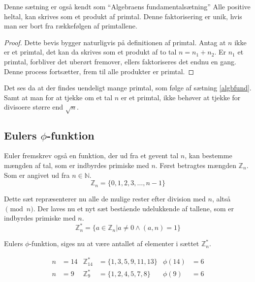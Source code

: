 %



\begin{sent}%
    Denne sætning er også kendt som ``Algebraens fundamentalsætning''
    Alle positive heltal, kan skrives som et produkt af primtal.
    Denne faktorisering er unik, hvis man ser bort fra rækkefølgen af primtallene.
    \label{algbfund}
\end{sent}

\begin{proof}
    Dette bevis bygger naturligvis på definitionen af primtal.
    Antag at \(n\) ikke er et primtal, det kan da skrives som et produkt af to tal \(n = n_1 + n_2\).
    Er \(n_1\) et primtal, forbliver det uberørt fremover, ellers faktoriseres det endnu en gang.
    Denne process fortsætter, frem til alle produkter er primtal.
\end{proof}

Det ses da at der findes uendeligt mange primtal, som følge af sætning \ref{algbfund}.
Samt at man for at tjekke om et tal \(n\) er et primtal, ikke behøver at tjekke for divisoere større end \(\sqrt{n}\).



\subsection{Eulers \texorpdfstring{\(\phi\)}{Lg}-funktion}
Euler fremskrev også en funktion, der ud fra et gevent tal \(n\), kan bestemme mængden af tal, som er indbyrdes primiske med \(n\).
Først betragtes mængden \(\mathbb{Z}_n\). Som er angivet ud fra \(n \in \mathbb{N}\).
\[\mathbb{Z}_n = \{0, 1, 2, 3, \hdots, n-1 \}\]

Dette sæt repræsenterer nu alle de mulige rester efter division med \(n\), altså \(\pmod{n}\).
Der laves nu et nyt sæt bestående udelukkende af tallene, som er indbyrdes primiske med \(n\).
\[\mathbb{Z}_n^* = \{a \in \mathbb{Z}_n | a \neq 0 \land (a, n) = 1\}\]

Eulers \(\phi\)-funktion, siges nu at være antallet af elementer i sættet \(\mathbb{Z}_n^*\).

\begin{eks}
    \mbox{}\vspace*{-1.5em}
    \begin{align*}
        n &= 14 & \mathbb{Z}_{14}^*  &= \{1, 3, 5, 9, 11, 13 \} & \phi(14) &= 6\\
        n &= 9  & \mathbb{Z}_9^*     &= \{1, 2, 4, 5, 7, 8\}    & \phi(9)  &= 6
    \end{align*}
\end{eks}

